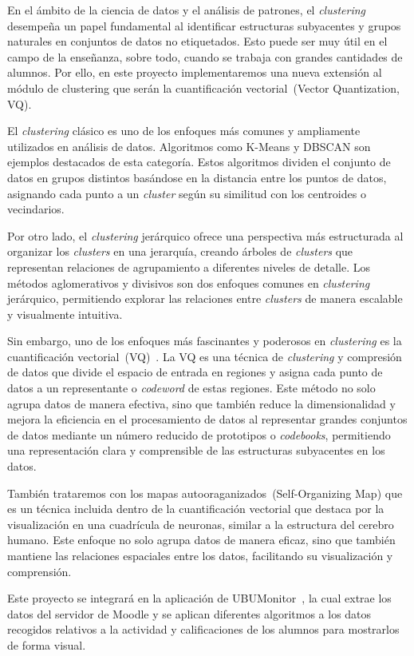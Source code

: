 
En el ámbito de la ciencia de datos y el análisis de patrones, el \emph{clustering}~\cite{immune:clustering} desempeña un papel fundamental al identificar estructuras subyacentes y grupos naturales en conjuntos de datos no etiquetados. Esto puede ser muy útil en el campo de la enseñanza, sobre todo, cuando se trabaja con grandes cantidades de alumnos. Por ello, en este proyecto implementaremos una nueva extensión al módulo de clustering que serán la cuantificación vectorial~(Vector Quantization, VQ). 

El \emph{clustering} clásico es uno de los enfoques más comunes y ampliamente utilizados en análisis de datos. Algoritmos como K-Means y DBSCAN son ejemplos destacados de esta categoría. Estos algoritmos dividen el conjunto de datos en grupos distintos basándose en la distancia entre los puntos de datos, asignando cada punto a un \emph{cluster} según su similitud con los centroides o vecindarios.

Por otro lado, el \emph{clustering} jerárquico ofrece una perspectiva más estructurada al organizar los \emph{clusters} en una jerarquía, creando árboles de \emph{clusters} que representan relaciones de agrupamiento a diferentes niveles de detalle. Los métodos aglomerativos y divisivos son dos enfoques comunes en \emph{clustering} jerárquico, permitiendo explorar las relaciones entre \emph{clusters} de manera escalable y visualmente intuitiva.

Sin embargo, uno de los enfoques más fascinantes y poderosos en \emph{clustering} es la cuantificación vectorial~(VQ)~\cite{saturn:vector}. La VQ es una técnica de \emph{clustering} y compresión de datos que divide el espacio de entrada en regiones y asigna cada punto de datos a un representante o \emph{codeword} de estas regiones. Este método no solo agrupa datos de manera efectiva, sino que también reduce la dimensionalidad y mejora la eficiencia en el procesamiento de datos al representar grandes conjuntos de datos mediante un número reducido de prototipos o \emph{codebooks}, permitiendo una representación clara y comprensible de las estructuras subyacentes en los datos.

También trataremos con los mapas autooraganizados~(Self-Organizing Map) que es un técnica incluida dentro de la cuantificación vectorial que destaca por la visualización en una cuadrícula de neuronas, similar a la estructura del cerebro humano. Este enfoque no solo agrupa datos de manera eficaz, sino que también mantiene las relaciones espaciales entre los datos, facilitando su visualización y comprensión.

Este proyecto se integrará en la aplicación de UBUMonitor~\cite{github:ubumonitor}, la cual extrae los datos del servidor de Moodle y se aplican diferentes algoritmos a los datos recogidos relativos a la actividad y calificaciones de los alumnos para mostrarlos de forma visual.